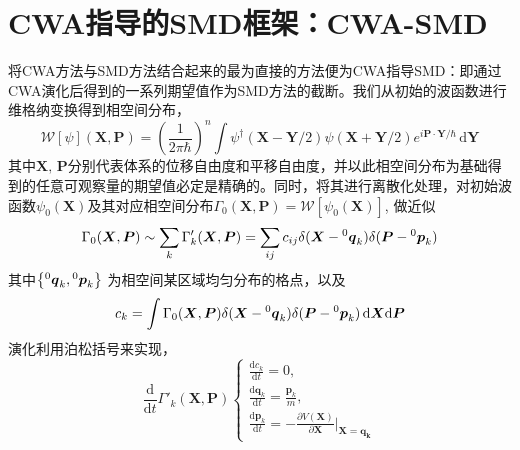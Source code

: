 
\section{CWA指导的SMD框架：CWA-SMD}

将CWA方法与SMD方法结合起来的最为直接的方法便为CWA指导SMD：即通过CWA演化后得到的一系列期望值作为SMD方法的截断。我们从初始的波函数进行维格纳变换得到相空间分布，
\begin{equation}
  \mathcal{W} \left[ \psi \right] (\boldsymbol{X}, \boldsymbol{P}) = \left(\frac{1}{2\pi \hbar}\right)^n \int \psi^\dagger(\boldsymbol{X}-\boldsymbol{Y}/2) \psi(\boldsymbol{X} + \boldsymbol{Y}/2) e^{i \boldsymbol{P} \cdot \boldsymbol{Y} / \hbar} \, \mathrm{d}\boldsymbol{Y} 
\end{equation}
其中$\boldsymbol{X}, \, \boldsymbol{P}$分别代表体系的位移自由度和平移自由度，并以此相空间分布为基础得到的任意可观察量的期望值必定是精确的。同时，将其进行离散化处理，对初始波函数$\psi_0(\boldsymbol{X})$及其对应相空间分布$ \Gamma_0(\boldsymbol{X}, \boldsymbol{P}) = \mathcal{W}\left[ \psi_0(\boldsymbol{X}) \right] $, 做近似
\begin{equation}
  \Gamma_0 (\boldsymbol{X}, \boldsymbol{P}) \sim \sum_{k} \Gamma_{k}'(\boldsymbol{X}, \boldsymbol{P}) = \sum_{ij} c_{ij} \delta(\boldsymbol{X} - \prescript{0}{}{\boldsymbol{q}_k}) \delta(\boldsymbol{P} - \prescript{0}{}{\boldsymbol{p}_k})
\end{equation}
其中$\left\{ \prescript{0}{}{\boldsymbol{q}_k}, \prescript{0}{}{\boldsymbol{p}_k} \right\} $ 为相空间某区域均匀分布的格点，以及
\begin{equation}
  c_{k} = \int \Gamma_0(\boldsymbol{X}, \boldsymbol{P}) \delta(\boldsymbol{X} - \prescript{0}{}{\boldsymbol{q}_k}) \delta(\boldsymbol{P} - \prescript{0}{}{\boldsymbol{p}_k}) \, \mathrm{d}\boldsymbol{X}\mathrm{d}\boldsymbol{P}
\end{equation}
演化利用泊松括号来实现，
\begin{equation}
\frac{\mathrm{d}}{\mathrm{d}t} \Gamma'_{k}(\boldsymbol{X}, \boldsymbol{P})
\begin{cases}
	\frac{\mathrm{d} c_{k}}{\mathrm{d} t} = 0 , \\
	\frac{\mathrm{d} \boldsymbol{q}_k}{\mathrm{d} t} = \frac{\boldsymbol{p}_k}{m} , \\
	\frac{\mathrm{d} \boldsymbol{p}_k}{\mathrm{d} t} = - \frac{\partial V(\boldsymbol{X})}{\partial \boldsymbol{X}}\bigg|_{\boldsymbol{X} = \boldsymbol{q_k}}
\end{cases}
\end{equation}
